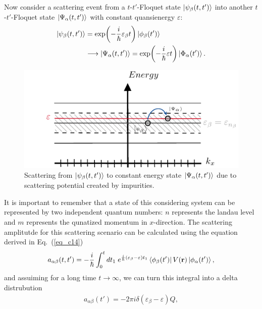 Now consider a scattering event from a $t$-$t'$-Floquet state $\ket{\psi_{\beta}(t,t')} $ into another $t$-$t'$-Floquet state $\ket{\Psi_{\alpha}(t,t')}$ with constant quansienergy $\varepsilon$:
\begin{equation} \label{eq_c15}
  \begin{aligned}
  \ket{\psi_{\beta}(t,t')} &= \exp(-\frac{i}{\hbar}\varepsilon_{\beta} t)
  \ket{\phi_{\beta}(t')} \\
  &
  \longrightarrow
  \ket{\Psi_{\alpha}(t,t')} = \exp(-\frac{i}{\hbar}\varepsilon t)
  \ket{\Phi_{\alpha}(t')}.
  \end{aligned}
\end{equation}
\begin{figure}[b]
  \includegraphics[scale=1.0]{figures/fig_2.pdf}
  \caption{Scattering from $\ket{\psi_{\beta}(t,t')}$ to constant energy state $\ket{\Psi_{\alpha}(t,t')}$ due to scattering potential created by impurities.}
  \label{fig_2}
\end{figure}
It is important to remember that a state of this considering system can be represented by two independent quantum numbers: $n$ represents the landau level and $m$ represents the qunatized momentum in $x$-direction. The scattering amplitutde for this scattering scenario can be calculated using the equation derived in Eq.~(\ref{eq_c14})
\begin{equation} \label{eq_c16}
  \begin{aligned}
    a_{\alpha\beta}(t,t') =
    -\frac{i}{\hbar}
    \int_{0}^t dt_1 \;
    e^{\frac{i}{\hbar}\qty(\varepsilon_{\beta} - \varepsilon)t_1}
    \bra{\phi_{\beta}(t')}
    V(\vb{r}) \ket{\phi_{\alpha}(t')},
  \end{aligned}
\end{equation}
and assuiming for a long time $t \rightarrow \infty$, we can turn this integral into a delta distrubution
\begin{equation} \label{eq_c17}
  \begin{aligned}
    a_{\alpha\beta}(t') =
    -2\pi i \delta(\varepsilon_{\beta} - \varepsilon)Q,
  \end{aligned}
\end{equation}
